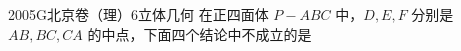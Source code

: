 
\begin{problem}{2005}{G}{北京卷（理）}{6}{立体几何}
在正四面体 $ P-ABC $ 中，$ D,E,F $ 分别是 $ AB,BC,CA $ 的中点，下面四个结论中不成立的是
\begin{choices}
\end{choices}
\end{problem}

\begin{answer}

\end{answer}

\begin{solutions}

\end{solutions}